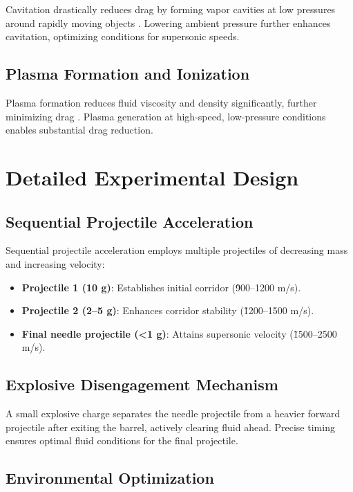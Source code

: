 \documentclass{article}
\begin{document}
Cavitation drastically reduces drag by forming vapor cavities at low pressures around rapidly moving objects \cite{brennen2013cavitation}. Lowering ambient pressure further enhances cavitation, optimizing conditions for supersonic speeds.

\subsection{Plasma Formation and Ionization}

Plasma formation reduces fluid viscosity and density significantly, further minimizing drag \cite{raizer1997gas}. Plasma generation at high-speed, low-pressure conditions enables substantial drag reduction.

\section{Detailed Experimental Design}

\subsection{Sequential Projectile Acceleration}

Sequential projectile acceleration employs multiple projectiles of decreasing mass and increasing velocity:
\begin{itemize}
\item \textbf{Projectile 1 (10 g)}: Establishes initial corridor (\~900–1200 m/s).
\item \textbf{Projectile 2 (2–5 g)}: Enhances corridor stability (\~1200–1500 m/s).
\item \textbf{Final needle projectile (<1 g)}: Attains supersonic velocity (\~1500–2500 m/s).
\end{itemize}

\subsection{Explosive Disengagement Mechanism}

A small explosive charge separates the needle projectile from a heavier forward projectile after exiting the barrel, actively clearing fluid ahead. Precise timing ensures optimal fluid conditions for the final projectile.

\subsection{Environmental Optimization}
\end{document}
